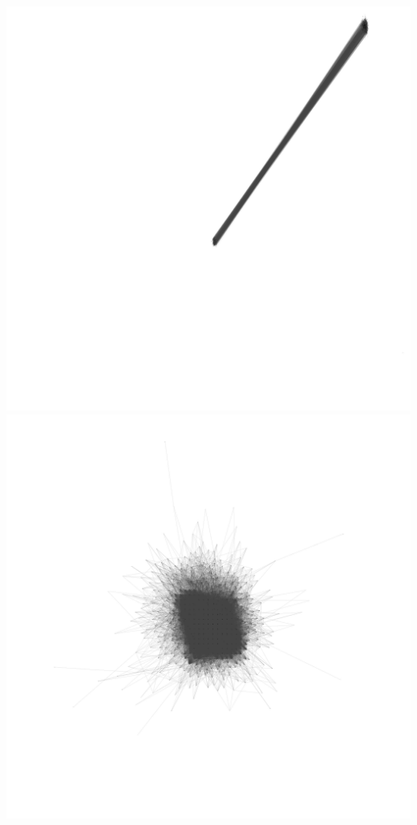 \documentclass[12pt, a4paper]{article}
\begin{document}
\begin{multicols}{2}
{
\label{fig:hdg_c5}}
{\centering
\includegraphics[width=\columnwidth]{src/youtube/hdg/comp/7_plot_drl}\\
\label{fig:hdg_c7}}
{\centering
\includegraphics[width=\columnwidth]{src/youtube/hdg/comp/6_plot_ghopt}\\
\label{fig:hdg_c6}}
\end{multicols}
\end{document}
